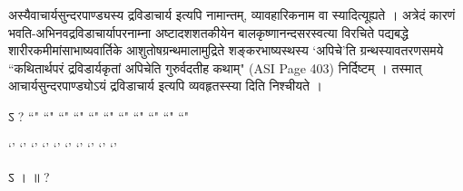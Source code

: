अस्यैवाचार्यसुन्दरपाण्ड्यस्य द्रविडाचार्य इत्यपि नामान्तम्, व्यावहारिकनाम वा स्यादित्यूह्यते । अत्रेदं कारणं भवति-अभिनवद्रविडाचार्यापरनाम्ना अष्टादशशतकीयेन बालकृष्णानन्दसरस्वत्या विरचिते पद्यबद्धे शारीरकमीमांसाभाष्यवार्तिके आशुतोषग्रन्थमालामुद्रिते शङ्करभाष्यस्थस्य `अपिचे'ति ग्रन्थस्यावतरणसमये ``कथितार्थपरं द्रविडार्यकृतां अपिचेति गुरुर्वदतीह कथाम्" (ASI Page 403) निर्दिष्टम् । तस्मात् आचार्यसुन्दरपाण्ड्योऽयं द्रविडाचार्य इत्यपि व्यवहृतस्स्या दिति निश्चीयते ।


ऽ  ?
``" ``" ``" ``" ``" ``" ``" ``" ``" ``" ``"

`' `' `' `' `' `' `' `' `' `' 

ऽ  ।   ॥ ?
